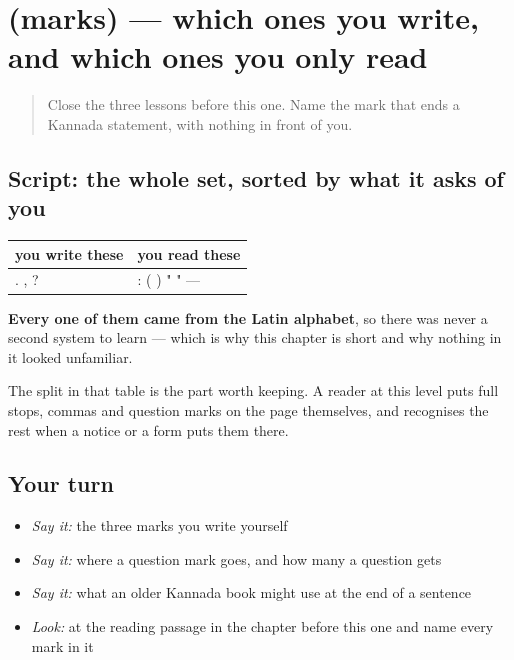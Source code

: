 \section[(marks)]{(marks) — which ones you write, and which ones you only read}

\label{lesson:KA-R77-marks-recall}



\begin{quote}
Close the three lessons before this one. Name the mark that ends a Kannada statement, with nothing in front of you.
\end{quote}

\subsection*{Script: the whole set, sorted by what it asks of you}
\noindent
\begin{tabularx}{\linewidth}{@{}>{\raggedright\arraybackslash}X>{\raggedright\arraybackslash}X@{}}
\toprule
\textbf{you write these} & \textbf{you read these} \\
\midrule
. , ? & : ( ) " " — \\
\bottomrule
\end{tabularx}

\textbf{Every one of them came from the Latin alphabet}, so there was never a second system to learn — which is why this chapter is short and why nothing in it looked unfamiliar.

The split in that table is the part worth keeping. A reader at this level puts full stops, commas and question marks on the page themselves, and recognises the rest when a notice or a form puts them there.

\subsection*{Your turn}
\begin{itemize}
\raggedright
  \item \emph{Say it:} the three marks you write yourself
  \item \emph{Say it:} where a question mark goes, and how many a question gets
  \item \emph{Say it:} what an older Kannada book might use at the end of a sentence
  \item \emph{Look:} at the reading passage in the chapter before this one and name every mark in it
\end{itemize}

